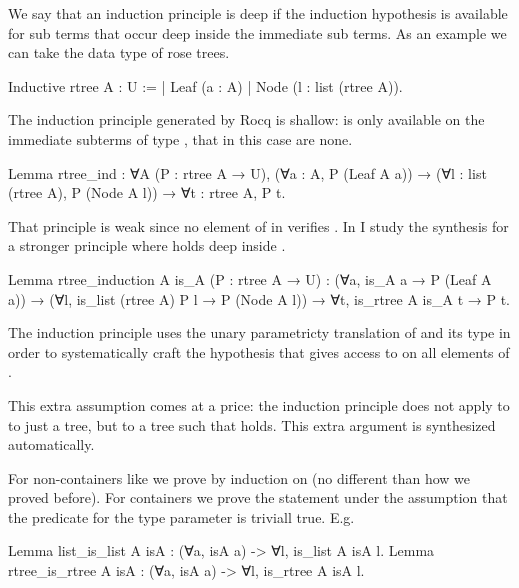 \documentclass[a4paper, 11pt]{book}
\begin{document}
We say that an induction principle is deep if the induction hypothesis is
available for sub terms that occur deep inside the immediate sub terms.
As an example we can take the data type of rose trees.

\begin{rocqcode}
Inductive rtree A : U :=
| Leaf (a : A)
| Node (l : list (rtree A)).
\end{rocqcode}

The induction principle generated by Rocq is shallow:  is
only available on the immediate subterms of type , that
in this case are none.

\begin{rocqcode}
Lemma rtree_ind : ∀A (P : rtree A → U),
  (∀a : A, P (Leaf A a)) →
  (∀l : list (rtree A), P (Node A l)) →
  ∀t : rtree A, P t.
\end{rocqcode}

That principle is weak since no element of  in 
verifies . In \cite{tassi:hal-01897468} I study the synthesis
for a stronger principle where  holds deep inside .

\begin{rocqcode}
Lemma rtree_induction A is_A (P : rtree A → U) :
  (∀a, is_A a → P (Leaf A a)) →
  (∀l, is_list (rtree A) P l → P (Node A l)) →
     ∀t, is_rtree A is_A t → P t.
\end{rocqcode}

The induction principle uses the unary parametricty
translation of  and its type in order to systematically craft
the hypothesis  that gives access to
 on all elements of .

This  extra assumption comes at a price: the induction principle does not apply
to to just a tree, but to a tree  such that
 holds. This extra argument is
synthesized automatically.

For non-containers like 
we prove  by induction on  (no different
than how we proved  before). For containers we prove
the statement under the assumption that the predicate for the type parameter
is triviall true. E.g.

\begin{rocqcode}
Lemma list_is_list A isA : (∀a, isA a) -> ∀l, is_list A isA l.
Lemma rtree_is_rtree A isA : (∀a, isA a) -> ∀l, is_rtree A isA l.
\end{rocqcode}
\end{document}

